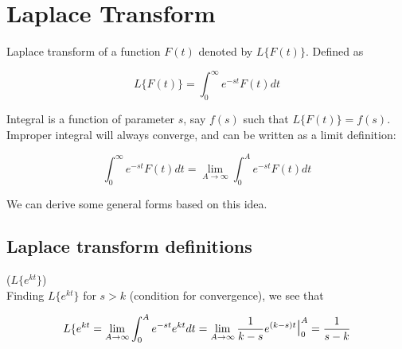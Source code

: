 \section{Laplace Transform}

Laplace transform of a function $F(t)$ denoted by $L\{F(t)\}$.
Defined as

\begin{equation}
    L\{F(t)\}=\int_0^\infty e^{-st}F(t)dt
\end{equation}

Integral is a function of parameter $s$, say $f(s)$ such that $L\{F(t)\}=f(s)$.
Improper integral will always converge, and can be written as a limit definition:

\begin{equation}
    \int_0^\infty e^{-st}F(t)dt=\lim_{A\to \infty}\int_0^Ae^{-st}F(t)dt
\end{equation}

We can derive some general forms based on this idea.

\subsection{Laplace transform definitions}

\begin{definition}($L\{e^{kt}\}$)\\
    Finding $L\{e^{kt}\}$ for $s>k$ (condition for convergence), we see that 

    \begin{equation}
        L\{e^{kt}=\lim_{A\to\infty} \int_0^A e^{-st}e^{kt}dt=\lim_{A\to\infty}\frac{1}{k-s}e^{(k-s)t}\mbox{\Large$\mid$}_0^A=\frac{1}{s-k}
    \end{equation}
\end{definition}

\newpage

